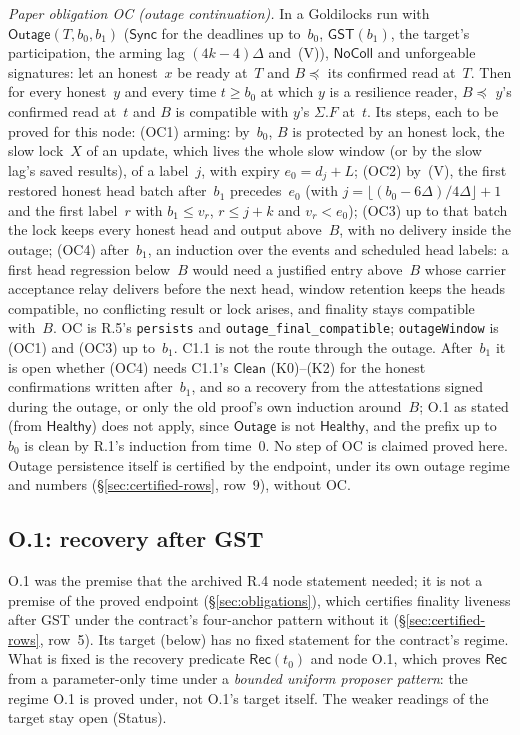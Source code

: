 \documentclass{article}
\begin{document}
\emph{Paper obligation OC (outage continuation).}  In a Goldilocks run with
$\mathsf{Outage}(T,b_0,b_1)$ ($\mathsf{Sync}$ for the deadlines up to~$b_0$,
$\mathsf{GST}(b_1)$, the target's participation, the arming lag
$(4k-4)\Delta$ and~(V)), $\mathsf{NoColl}$ and unforgeable signatures: let an
honest~$x$ be ready at~$T$ and $B\preceq$ its confirmed read at~$T$.  Then for
every honest~$y$ and every time $t\geq b_0$ at which $y$ is a resilience reader,
$B\preceq$ $y$'s confirmed read at~$t$ and $B$ is compatible with $y$'s
$\Sigma.F$ at~$t$.  Its steps, each to be proved for this node: (OC1) arming:
by~$b_0$, $B$ is protected by an honest lock, the slow lock~$X$ of an
update, which lives the whole slow window (or by the slow lag's saved
results), of a label~$j$, with expiry $e_0=d_j+L$; (OC2) by~(V), the first
restored honest head batch after~$b_1$ precedes~$e_0$ (with
$j=\lfloor(b_0-6\Delta)/4\Delta\rfloor+1$ and the first label~$r$ with
$b_1\leq v_r$, $r\leq j+k$ and $v_r<e_0$); (OC3) up to that batch the lock keeps
every honest head and output above~$B$, with no delivery inside the outage; (OC4)
after~$b_1$, an induction over the events and scheduled head labels: a first
head regression below~$B$ would need a justified entry above~$B$ whose carrier
acceptance relay delivers before the next head, window retention keeps the heads
compatible, no conflicting result or lock arises, and finality stays compatible
with~$B$.  OC is R.5's \texttt{persists} and \texttt{outage\_final\_compatible};
\texttt{outageWindow} is (OC1) and (OC3) up to~$b_1$.  C1.1 is not the route
through the outage.  After~$b_1$ it is open whether (OC4) needs C1.1's
$\mathsf{Clean}$ (K0)--(K2) for the honest confirmations written after~$b_1$,
and so a recovery from the attestations signed during the outage, or only the old
proof's own induction around~$B$; O.1 as stated (from $\mathsf{Healthy}$) does
not apply, since $\mathsf{Outage}$ is not $\mathsf{Healthy}$, and the prefix up
to~$b_0$ is clean by R.1's induction from time~$0$.  No step of OC is claimed
proved here.  Outage persistence itself is certified by the endpoint, under
its own outage regime and numbers (\S\ref{sec:certified-rows}, row~9),
without OC.

\subsection*{O.1: recovery after GST}

O.1 was the premise that the archived R.4 node statement needed; it is not
a premise of the proved endpoint (\S\ref{sec:obligations}), which certifies
finality liveness after GST under the contract's four-anchor pattern without
it (\S\ref{sec:certified-rows}, row~5).  Its target (below) has no fixed
statement for the contract's regime.  What is fixed is the
recovery predicate $\mathsf{Rec}(t_0)$ and node O.1, which proves
$\mathsf{Rec}$ from a parameter-only time under a \emph{bounded uniform
proposer pattern}: the regime O.1 is proved under, not O.1's target itself.
The weaker readings of the target stay open (Status).
\end{document}
